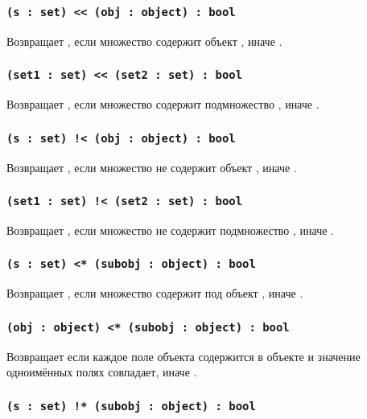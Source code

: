 \subsubsection{\lstinline`(s : set) << (obj : object) : bool`}

Возвращает \true{}, если множество  содержит объект , иначе \false{}.

\subsubsection{\lstinline|(set1 : set) << (set2 : set) : bool|}

Возвращает \true, если множество  содержит подмножество , иначе \false.

\subsubsection{\lstinline`(s : set) !< (obj : object) : bool`}

Возвращает \true{}, если множество  не содержит объект , иначе \false{}.

\subsubsection{\lstinline|(set1 : set) !< (set2 : set) : bool|}

Возвращает \true, если множество  не содержит подмножество , иначе \false.

\subsubsection{\lstinline`(s : set) <* (subobj : object) : bool`}

Возвращает \true{}, если множество  содержит под объект , иначе \false{}.

\subsubsection{\lstinline`(obj : object) <* (subobj : object) : bool`}

Возвращает \true{} если каждое поле объекта  содержится в объекте  и значение одноимённых полях совпадает, иначе \false{}.

\subsubsection{\lstinline`(s : set) !* (subobj : object) : bool`}

